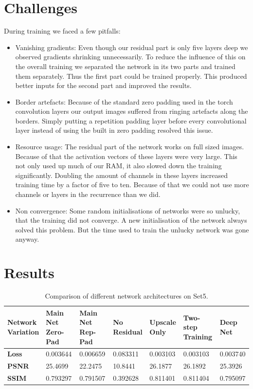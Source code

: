 \documentclass[11pt]{article}
\begin{document}
\section{Challenges}
During training we faced a few pitfalls:
\begin{itemize}
	\item	Vanishing gradients: Even though our residual part is only five layers deep we observed gradients shrinking unnecessarily. To reduce the influence of this on the overall training we separated the network in its two parts and trained them separately. Thus the first part could be trained properly. This produced better inputs for the second part and improved the results.
	\item	Border artefacts: Because of the standard zero padding used in the torch convolution layers our output images suffered from ringing artefacts along the borders. Simply putting a repetition padding layer before every convolutional layer instead of using the built in zero padding resolved this issue.
	\item	Resource usage: The residual part of the network works on full sized images. Because of that the activation vectors of these layers were very large. This not only used up much of our RAM, it also slowed down the training significantly. Doubling the amount of channels in these layers increased training time by a factor of five to ten. Because of that we could not use more channels or layers in the recurrence than we did.
	\item	Non convergence: Some random initialisations of networks were so unlucky, that the training did not converge. A new initialisation of the network always solved this problem. But the time used to train the unlucky network was gone anyway.
\end{itemize}

\newpage
\section{Results}

\begin{table}[h!]
    \renewcommand{\arraystretch}{1.5}
    \begin{tabularx}{\textwidth}{ |X*{6}{|R}| }
        \hline
        \parbox[t]{5cm}{\textbf{Network\\ Variation}} & \centering Main Net Zero-Pad & \centering Main Net Rep-Pad & \centering No Residual & \centering Upscale Only & \centering Two-step Training & \centering Deep Net \tabularnewline
        \hline
        \textbf{Loss}& 0.003644 & 0.006659 & 0.083311 & 0.003103 & 0.003103 & 0.003740\\
        \hline
        \textbf{PSNR}&  25.4699 &  22.2475 &  10.8441 &  26.1877 &  26.1892 &  25.3926\\
        \hline
        \textbf{SSIM}& 0.793297 & 0.791507 & 0.392628 & 0.811401 & 0.811404 & 0.795097\\
        \hline
    \end{tabularx}
    \caption{Comparison of different network architectures on Set5.}
    \label{label:tableResultsSet5}
\end{table}
\end{document}

